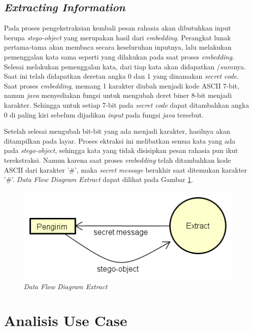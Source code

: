 \subsection{\textit{Extracting Information}}
Pada proses pengekstraksian kembali pesan rahasia akan dibutuhkan input berupa \textit{stego-object} yang merupakan hasil dari \textit{embedding}. Perangkat lunak pertama-tama akan membaca secara keseluruhan inputnya, lalu melakukan pemenggalan kata sama seperti yang dilakukan pada saat proses \textit{embedding}. Selesai melakukan pemenggalan kata, dari tiap kata akan didapatkan $/sum$nya. Saat ini telah didapatkan deretan angka 0 dan 1 yang dinamakan \textit{secret code}. Saat proses \textit{embedding}, memang 1 karakter diubah menjadi kode ASCII 7-bit, namun \textit{java} menyediakan fungsi untuk mengubah deret biner 8-bit menjadi karakter. Sehingga untuk setiap 7-bit pada \textit{secret code} dapat ditambahkan angka 0 di paling kiri sebelum dijadikan \textit{input} pada fungsi \textit{java} tersebut.

Setelah selesai mengubah bit-bit yang ada menjadi karakter, hasilnya akan ditampilkan pada layar. Proses ektraksi ini melibatkan semua kata yang ada pada \textit{stego-object}, sehingga kata yang tidak disisipkan pesan rahasia pun ikut terekstraksi. Namun karena saat proses \textit{embedding} telah ditambahkan kode ASCII dari karakter '\#', maka \textit{secret message} berakhir saat ditemukan karakter '\#'. \textit{Data Flow Diagram Extract} dapat dilihat pada Gambar \ref{fig:5-dfd-extract}.

\begin{figure}[H]
	\centering
	\includegraphics[scale=0.8]{Gambar/dfd-extract}
	\caption{\textit{Data Flow Diagram Extract}} 
	\label{fig:5-dfd-extract}
\end{figure}

\section{Analisis Use Case}

